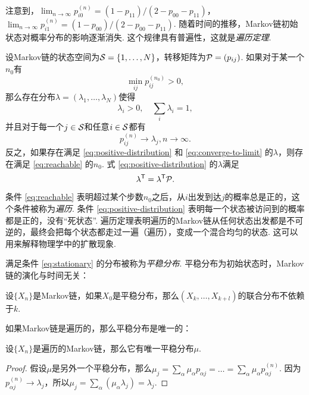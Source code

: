 注意到，$\lim_{n\to\infty}p_{i0}^{(n)}=(1-p_{11})/(2-p_{00}-p_{11})$，$\lim_{n\to\infty}p_{i1}^{(n)}=(1-p_{00})/(2-p_{00}-p_{11})$. 随着时间的推移，Markov链初始状态对概率分布的影响逐渐消失. 这个规律具有普遍性，这就是\emph{遍历定理}.


\begin{theorem}[遍历定理]\label{thm:ergodic-theorem}
    设Markov链的状态空间为$\MS=\{1,\dots,N\}$，转移矩阵为$\P=(p_{ij})$. 如果对于某一个$n_0$有
    \begin{equation}
        \min_{ij}p_{ij}^{(n_0)}>0,\label{eq:reachable}
    \end{equation}
    那么存在分布$\lambda=(\lambda_1,\dots,\lambda_N)$使得
    \begin{equation}
        \lambda_i>0,\quad\sum_i\lambda_i=1,\label{eq:positive-distribution}
    \end{equation}
    并且对于每一个$j\in\MS$和任意$i\in\MS$都有
    \begin{equation}
    p_{ij}^{(n)}\to\lambda_j,n\to\infty.\label{eq:converge-to-limit}
    \end{equation}
    反之，如果存在满足 \eqref{eq:positive-distribution} 和 \eqref{eq:converge-to-limit} 的$\lambda$，则存在满足 \eqref{eq:reachable} 的$n_0$.
    式 \eqref{eq:positive-distribution} 的$\lambda$满足
    \begin{equation}
        \lambda^\t = \lambda^\t\P.\label{eq:stationary}
    \end{equation}
\end{theorem}

条件 \eqref{eq:reachable} 表明超过某个步数$n_0$之后，从$i$出发到达$j$的概率总是正的，这个条件被称为\emph{遍历}. 条件 \eqref{eq:positive-distribution} 表明每一个状态被访问到的概率都是正的，没有``死状态''. 遍历定理表明遍历的Markov链从任何状态出发都是不可逆的，最终会把每个状态都走过一遍（遍历），变成一个混合均匀的状态. 这可以用来解释物理学中的扩散现象. %

满足条件 \eqref{eq:stationary} 的分布被称为\emph{平稳分布}. 平稳分布为初始状态时，Markov链的演化与时间无关：
\begin{proposition}\label{prop:stationary-distribution}
设$\{X_n\}$是Markov链，如果$X_0$是平稳分布，那么$(X_k,\dots,X_{k+l})$的联合分布不依赖于$k$.
\end{proposition}

如果Markov链是遍历的，那么平稳分布是唯一的：
\begin{proposition}\label{prop:unique-stationary-distribution}
设$\{X_n\}$是遍历的Markov链，那么它有唯一平稳分布$\mu$. 
\end{proposition}
    \begin{proof}
        假设$\mu$是另外一个平稳分布，那么$\mu_j=\sum_\alpha\mu_\alpha p_{\alpha j}=\dots=\sum_{\alpha}\mu_\alpha p_{\alpha j}^{(n)}$. 因为$p_{\alpha j}^{(n)}\to \lambda_j$，所以$\mu_j=\sum_{\alpha} (\mu_\alpha\lambda_j)=\lambda_j$.
    \end{proof}

